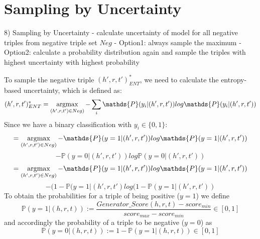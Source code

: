 \section{Sampling by Uncertainty} 
\label{sec:sampling_by_uncertainty}

8) Sampling by Uncertainty
- calculate uncertainty of model for all negative triples from negative triple set $Neg$
- Option1: always sample the maximum
- Option2: calculate a probability distribution again and sample the triples with highest uncertainty with highest probability



To sample the negative triple $(h',r,t')^{*}_{ENT}$, we need to calculate the entropy-based uncertainty, which is defined as: 
$$(h',r,t')^{*}_{ENT} = \argmax_{(h',r,t') \in Neg)} -  \sum_{i}{\mathds{P}(y_i | (h',r,t')) log \mathds{P}(y_i|(h',r,t'))}$$
Since we have a binary classification with $y_i \in \{0,1\}$:\\
$$= \argmax_{(h',r,t') \in Neg)} - \mathds{P}(y = 1| (h',r,t')) log \mathds{P}(y = 1|(h',r,t'))$$
$$- \mathds{P}(y = 0| (h',r,t')) log \mathds{P}(y = 0|(h',r,t'))$$
$$= \argmax_{(h',r,t') \in Neg)} - \mathds{P}(y = 1| (h',r,t')) log \mathds{P}(y = 1|(h',r,t'))$$
$$- (1 - \mathds{P}(y = 1|(h',r,t') log(1 - \mathds{P}(y = 1|(h',r,t'))$$
To obtain the probabilities for a triple of being positive ($y=1$) we define
\begin{equation}
    \mathds{P}(y = 1|(h, r, t)) := \frac{Generator\_Score(h, r, t) - score_{min}}{score_{max} - score_{min}} \in [0, 1]
\end{equation}
and accordingly the probability of a triple to be negative ($y=0$) as
\begin{equation}
    \mathds{P}(y = 0|(h, r, t)) := 1 - \mathds{P}(y = 1|(h, r, t)) \in [0,1]
\end{equation}


